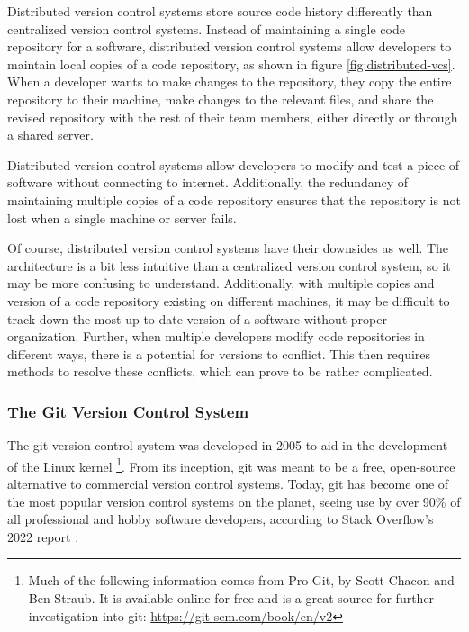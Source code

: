 \documentclass{article}
\begin{document}
Distributed version control systems store source code history differently than centralized version control systems. Instead of maintaining a single code repository for a software, distributed version control systems allow developers to maintain local copies of a code repository, as shown in figure \ref{fig:distributed-vcs}. When a developer wants to make changes to the repository, they copy the entire repository to their machine, make changes to the relevant files, and share the revised repository with the rest of their team members, either directly or through a shared server.

Distributed version control systems allow developers to modify and test a piece of software without connecting to internet. Additionally, the redundancy of maintaining multiple copies of a code repository ensures that the repository is not lost when a single machine or server fails.

Of course, distributed version control systems have their downsides as well. The architecture is a bit less intuitive than a centralized version control system, so it may be more confusing to understand. Additionally, with multiple copies and version of a code repository existing on different machines, it may be difficult to track down the most up to date version of a software without proper organization. Further, when multiple developers modify code repositories in different ways, there is a potential for versions to conflict. This then requires methods to resolve these conflicts, which can prove to be rather complicated.

\subsubsection{The Git Version Control System}

The git version control system was developed in 2005 to aid in the development of the Linux kernel \footnote{Much of the following information comes from Pro Git, by Scott Chacon and Ben Straub. It is available online for free and is a great source for further investigation into git: \url{https://git-scm.com/book/en/v2}}\cite{ChaconStraub_2014}. From its inception, git was meant to be a free, open-source alternative to commercial version control systems. Today, git has become one of the most popular version control systems on the planet, seeing use by over 90\% of all professional and hobby software developers, according to Stack Overflow's 2022 report \cite{StackOverflow_2022}. 
\end{document}
